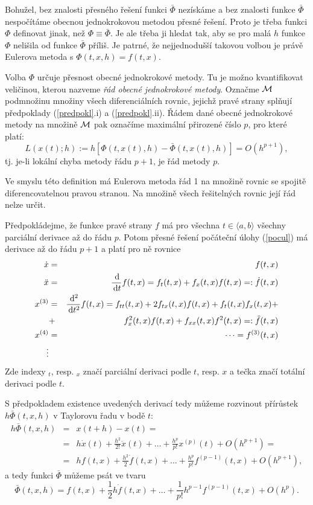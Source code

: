 \documentclass[a4paper, 12pt]{book}
\theoremstyle{definition}
\def\d{\,{\rm d}}               %
\begin{document}
Bohužel, bez znalosti přesného řešení funkci $\bar\Phi$ nezískáme a bez znalosti funkce 
$\bar\Phi$ nespočítáme obecnou jednokrokovou metodou přesné řešení. Proto je třeba 
funkci $\Phi$ definovat jinak, než $\Phi\equiv\bar\Phi$. Je ale třeba ji hledat tak,
aby se pro malá $h$ funkce $\Phi$ nelišila od funkce $\bar\Phi$ příliš. Je patrné, že
nejjednodušší takovou volbou je právě Eulerova metoda s $\Phi(t,x,h)=f(t,x)$.

Volba $\Phi$ určuje přesnost obecné jednokrokové metody. Tu je možno kvantifikovat
veličinou, kterou nazveme {\em řád obecné jednokrokové metody}. Označme $\cal M$ 
podmnožinu množiny všech diferenciálních rovnic, jejichž pravé strany splňují 
předpoklady (\ref{predpokl}.i) a (\ref{predpokl}.ii). Řádem dané obecné jednokrokové 
metody na množině $\cal M$ pak označíme maximální přirozené číslo $p$, pro které
platí:
\begin{displaymath}
 L(x(t);h):=h[\Phi(t,x(t),h)-\bar\Phi(t,x(t),h)]=O(h^{p+1}),
\end{displaymath}
tj. je-li lokální chyba metody řádu $p+1$, je řád metody $p$.

Ve smyslu této definition má Eulerova metoda řád 1 na množině rovnic se spojitě 
diferencovatelnou pravou stranou. Na množině všech řešitelných rovnic její
řád nelze určit.

Předpokládejme, že funkce pravé strany $f$ má pro všechna $t\in\langle a,b\rangle$
všechny parciální derivace až do řádu $p$. Potom přesné řešení počáteční úlohy 
(\ref{pocul}) má derivace až do řádu $p+1$ a platí pro ně rovnice
\begin{eqnarray*}
\dot x &=& f(t,x)\\
\ddot x &=& \frac{\d}{\d t} f(t,x)=f_t(t,x) + f_x(t,x) f(t,x) =: \dot f(t,x)\\
x^{(3)} &=& \frac{\d^2}{\d t^2} f(t,x)=f_{tt}(t,x)+2 f_{tx}(t,x)f(t,x) + f_t(t,x)f_x(t,x) + \\ %
&+&f_x^2(t,x)f(t,x) + f_{xx}(t,x)f^2(t,x) =: \ddot f(t,x)\\
x^{(4)} &=& \dots = f^{(3)}(t,x)\\
\vdots &&
\end{eqnarray*}
Zde indexy $_t$, resp. $_x$ značí parciální derivaci podle $t$, resp. $x$ a tečka 
značí totální derivaci podle $t$.

S předpokladem existence uvedených derivací tedy můžeme rozvinout přírůstek
$h\bar\Phi(t,x,h)$ v Taylorovu řadu v bodě $t$:
\begin{eqnarray*}
h\bar\Phi(t,x,h) &=& x(t+h) - x(t) = \\
&=&h\dot x(t) + \frac{h^2}{2!}\ddot x(t)+\dots+\frac{h^p}{p!}x^{(p)}(t)+O(h^{p+1})=\\
&=&hf(t,x)+ \frac{h^2}{2}\dot f(t,x)+\dots+\frac{h^p}{p!}f^{(p-1)}(t,x)+O(h^{p+1}),
\end{eqnarray*}
a tedy funkci $\bar\Phi$ můžeme psát ve tvaru
\begin{equation}\label{Taylor}
\bar\Phi(t,x,h) = f(t,x)+ \frac{1}{2}h\dot f(t,x)+\dots+\frac{1}{p!}h^{p-1}f^{(p-1)}(t,x)+O(h^{p}).
\end{equation}
\end{document}
